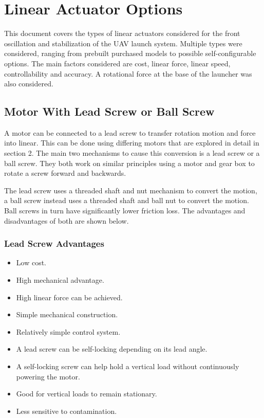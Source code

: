 \documentclass{article}
\begin{document}
\section{Linear Actuator Options}


This document covers the types of linear actuators considered for the front 
oscillation and stabilization of the UAV launch system. Multiple types were considered, 
ranging from prebuilt purchased models to possible self-configurable options. 
The main factors considered are cost, linear force, linear speed, controllability and accuracy.
A rotational force at the base of the launcher was also considered. 

\subsection{Motor With Lead Screw or Ball Screw}


A motor can be connected to a lead screw to transfer rotation motion and force into linear. 
This can be done using differing motors that are explored in detail in section 2.
The main two mechanisms to cause this conversion is a lead screw or a ball screw. 
They both work on similar principles using a motor and gear box to rotate a screw forward and backwards. 

The lead screw uses a threaded shaft and nut mechanism to convert the motion, a ball screw 
instead uses a threaded shaft and ball nut to convert the motion. Ball screws in turn have significantly 
lower friction loss. The advantages and disadvantages of both are shown below. 
\subsubsection{ Lead Screw Advantages}

\begin{itemize}
    \item Low cost.
    \item High mechanical advantage.
    \item High linear force can be achieved.
    \item Simple mechanical construction.
    \item Relatively simple control system.
    \item A lead screw can be self-locking depending on its lead angle.
    \item A self-locking screw can help hold a vertical load without
    continuously powering the motor.
    \item Good for vertical loads to remain stationary. 
    \item Less sensitive to contamination. 
\end{itemize}
\end{document}
